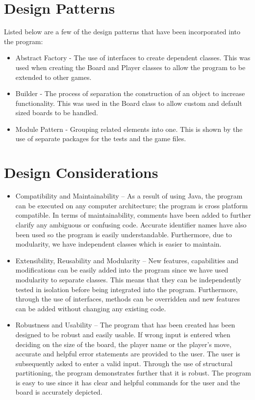 \documentclass[a4wide, 11pt]{article}
\begin{document}
\section{Design Patterns}
Listed below are a few of the design patterns that have been incorporated into the program:
\begin{itemize}

    \item Abstract Factory - The use of interfaces to create dependent classes. This was used when creating the Board and Player classes to allow the program to be extended to other games.

    \item Builder - The process of separation the construction of an object to increase functionality. This was used in the Board class to allow custom and default sized boards to be handled.

    \item Module Pattern - Grouping related elements into one. This is shown by the use of separate packages for the tests and the game files.
    
\end{itemize}
\section{Design Considerations}

\begin{itemize}

    \item Compatibility and Maintainability – As a result of using Java, the program can be executed on any computer architecture; the program is cross platform compatible. In terms of maintainability, comments have been added to further clarify any ambiguous or confusing code. Accurate identifier names have also been used so the program is easily understandable. Furthermore, due to modularity, we have independent classes which is easier to maintain.

   \item Extensibility, Reusability and Modularity – New features, capabilities and modifications can be easily added into the program since we have used modularity to separate classes. This means that they can be independently tested in isolation before being integrated into the program. Furthermore, through the use of interfaces, methods can be overridden and new features can be added without changing any existing code. 

   \item Robustness and Usability – The program that has been created has been designed to be robust and easily usable. If wrong input is entered when deciding on the size of the board, the player name or the player's move, accurate and helpful error statements are provided to the user. The user is subsequently asked to enter a valid input. Through the use of structural partitioning, the program demonstrates further that it is robust. The program is easy to use since it has clear and helpful commands for the user and the board is accurately depicted. 
 
\end{itemize}
\end{document}
